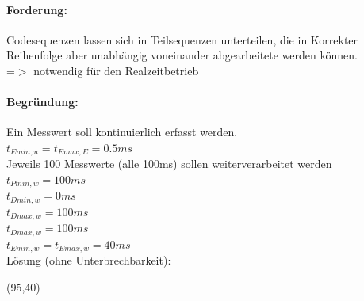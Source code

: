 \documentclass[12pt,a4paper,oneside,ngerman]{article}
\begin{document}
\paragraph{Forderung:}
Codesequenzen lassen sich in Teilsequenzen unterteilen, die in Korrekter Reihenfolge aber unabhängig voneinander abgearbeitete werden können. \\
=$>$ notwendig für den Realzeitbetrieb

\paragraph{Begründung:}
Ein Messwert soll kontinuierlich erfasst werden. \\
\(t_{Emin,u} = t_{Emax,E} = 0.5ms\) \\
Jeweils 100 Messwerte (alle 100ms) sollen weiterverarbeitet werden \\
\(t_{Pmin,w} = 100ms\) \\
\(t_{Dmin,w} = 0ms\) \\
\(t_{Dmax,w} = 100ms\) \\
\(t_{Dmax,w} = 100ms\) \\ 
\(t_{Emin,w} = t_{Emax,w} = 40ms\) \\

Lösung (ohne Unterbrechbarkeit):\\
\begin{struktogramm}(95,40)
		\whileend
	\whileend
\end{struktogramm}

\end{document}
